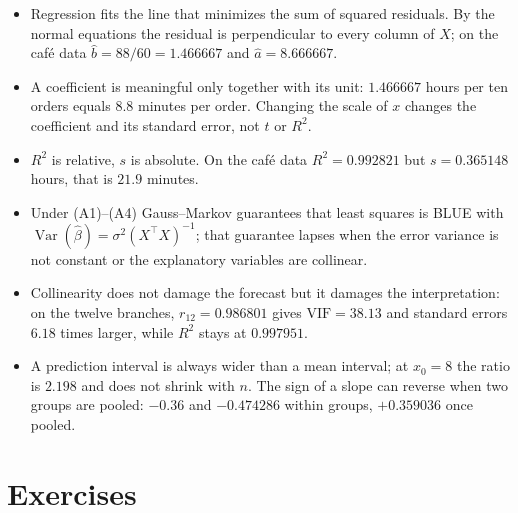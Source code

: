 \begin{ringkasan}
\begin{itemize}
  \item Regression fits the line that minimizes the sum of squared residuals. By the normal
        equations the residual is perpendicular to every column of $X$; on the café data
        $\hat b=88/60=1.466667$ and $\hat a=8.666667$.
  \item A coefficient is meaningful only together with its unit: $1.466667$ hours per ten orders
        equals $8.8$ minutes per order. Changing the scale of $x$ changes the coefficient and its
        standard error, not $t$ or $R^2$.
  \item $R^2$ is relative, $s$ is absolute. On the café data $R^2=0.992821$ but $s=0.365148$
        hours, that is $21.9$ minutes.
  \item Under (A1)--(A4) Gauss--Markov guarantees that least squares is BLUE with
        $\operatorname{Var}(\hat\beta)=\sigma^2(X^{\top}X)^{-1}$; that guarantee lapses when the
        error variance is not constant or the explanatory variables are collinear.
  \item Collinearity does not damage the forecast but it damages the interpretation: on the
        twelve branches, $r_{12}=0.986801$ gives $\mathrm{VIF}=38.13$ and standard errors $6.18$
        times larger, while $R^2$ stays at $0.997951$.
  \item A prediction interval is always wider than a mean interval; at $x_0=8$ the ratio is
        $2.198$ and does not shrink with $n$. The sign of a slope can reverse when two groups are
        pooled: $-0.36$ and $-0.474286$ within groups, $+0.359036$ once pooled.
\end{itemize}
\end{ringkasan}

\section{Exercises}

